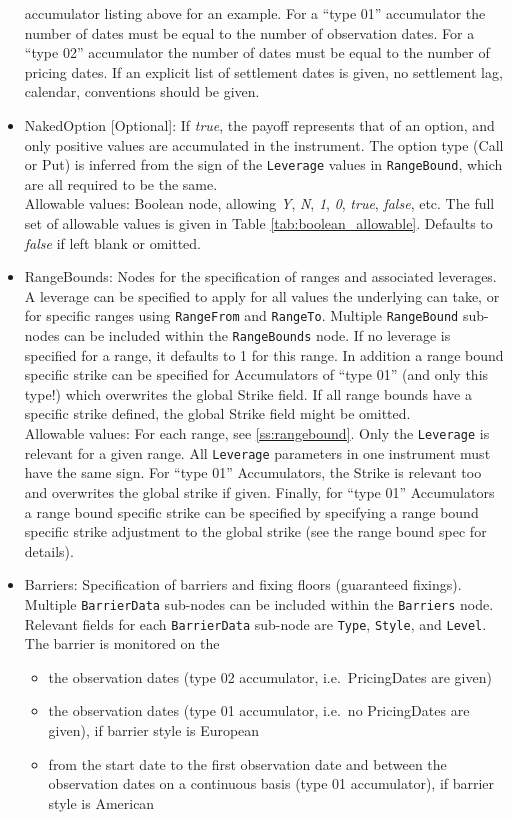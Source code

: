 \begin{itemize}
  accumulator listing above for an example. For a ``type 01'' accumulator the number of dates must be equal to the
  number of observation dates. For a ``type 02'' accumulator the number of dates must be equal to the number of pricing
  dates. If an explicit list of settlement dates is given, no settlement lag, calendar, conventions should be given.
\item NakedOption [Optional]: If \emph{true}, the payoff represents that of an option, and only positive values are accumulated in the instrument. The option type (Call or Put) is inferred from the sign of the \lstinline!Leverage! values in \lstinline!RangeBound!, which are all required to be the same.\\
  Allowable values: Boolean node, allowing \emph{Y}, \emph{N}, \emph{1}, \emph{0}, \emph{true}, \emph{false}, etc.
  The full set of allowable values is given in Table \ref{tab:boolean_allowable}. Defaults to \emph{false} if left blank or omitted.
\item RangeBounds: Nodes for the specification of ranges and associated leverages. A leverage can be specified to apply for all values the underlying can take, or for specific ranges using \lstinline!RangeFrom! and \lstinline!RangeTo!. Multiple \lstinline!RangeBound! sub-nodes can be included within the \lstinline!RangeBounds! node. If no leverage is specified for a range, it defaults to 1 for this range. In addition a range bound specific strike can be specified for Accumulators of ``type 01'' (and only this type!) which overwrites the global Strike field. If all range bounds have a specific strike defined, the global Strike field might be omitted. \\
    Allowable values: For each range, see \ref{ss:rangebound}. Only the \lstinline!Leverage! is relevant for a given range. All \lstinline!Leverage! parameters in one instrument must have the same sign. For ``type 01'' Accumulators, the Strike is relevant too and overwrites the global strike if given. Finally, for ``type 01'' Accumulators a range bound specific strike can be specified by specifying a range bound specific strike adjustment to the global strike (see the range bound spec for details).
\item Barriers: Specification of barriers and fixing floors (guaranteed fixings). Multiple \lstinline!BarrierData! sub-nodes can be included within the \lstinline!Barriers! node. Relevant fields for each \lstinline!BarrierData! sub-node are \lstinline!Type!, \lstinline!Style!, and \lstinline!Level!.  The barrier is monitored on the
  \begin{itemize}
    \item the observation dates (type 02 accumulator, i.e.\ PricingDates are given)
    \item the observation dates (type 01 accumulator, i.e.\ no PricingDates are given), if barrier style is European
    \item from the start date to the first observation date and between the observation dates on a continuous basis
      (type 01 accumulator), if barrier style is American
  \end{itemize}


\end{itemize}
